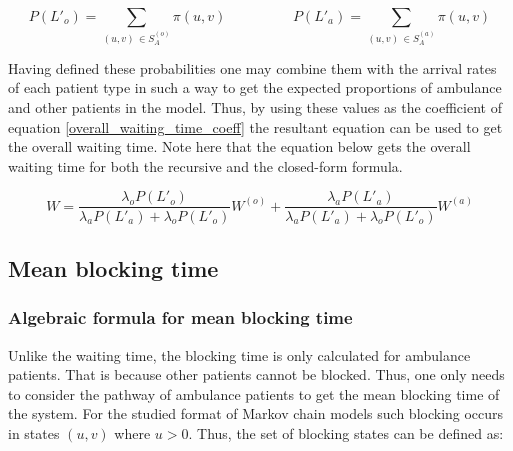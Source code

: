 \begin{equation*}
    P(L'_o) = \sum_{(u,v) \, \in S_A^{(o)}} \pi(u,v) \hspace{2cm}
    P(L'_a) = \sum_{(u,v) \, \in S_A^{(a)}} \pi(u,v)
\end{equation*}

Having defined these probabilities one may combine them with the arrival rates of 
each patient type in such a way to get the expected proportions of ambulance and 
other patients in the model. 
Thus, by using these values as the coefficient of equation \ref{overall_waiting_time_coeff} 
the resultant equation can be used to get the overall waiting time. 
Note here that the equation below gets the overall waiting time for both the recursive 
and the closed-form formula.

\begin{equation}\label{overall_waiting_time}
    W = \frac{\lambda_o P(L'_o)}{\lambda_a P(L'_a) + \lambda_o P(L'_o)} W^{(o)} + 
    \frac{\lambda_a P(L'_a)}{\lambda_a P(L'_a) + \lambda_o P(L'_o)} W^{(a)}
\end{equation}





\subsection{Mean blocking time}

\subsubsection{Algebraic formula for mean blocking time}

Unlike the waiting time, the blocking time is only calculated for ambulance patients.
That is because other patients cannot be blocked. Thus, one only needs to consider 
the pathway of ambulance patients to get the mean blocking time of the system. For 
the studied format of Markov chain models such blocking occurs in states \((u,v)\) 
where \(u > 0 \). Thus, the set of blocking states can be defined as:

